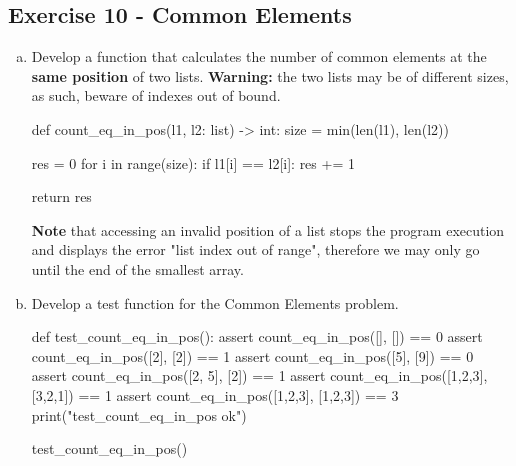 \documentclass[12pt]{article}
\begin{document}
\subsection*{Exercise 10 - Common Elements}
\begin{enumerate}[a)]
  \item Develop a function that calculates the number of common elements at the 
    \textbf{same position} of two lists. \textbf{Warning:} the two lists may be 
    of different sizes, as such, beware of indexes out of bound.
\begin{pythonlst}
def count_eq_in_pos(l1, l2: list) -> int:
  size = min(len(l1), len(l2))

  res = 0
  for i in range(size):
    if l1[i] == l2[i]:
      res += 1

  return res
\end{pythonlst}
\textbf{Note} that accessing an invalid position of a list stops the program
execution and displays the error "list index out of range", therefore we may
only go until the end of the smallest array.
  \item Develop a test function for the Common Elements problem.
\begin{pythonlst}
def test_count_eq_in_pos():
  assert count_eq_in_pos([], []) == 0
  assert count_eq_in_pos([2], [2]) == 1
  assert count_eq_in_pos([5], [9]) == 0
  assert count_eq_in_pos([2, 5], [2]) == 1
  assert count_eq_in_pos([1,2,3], [3,2,1]) == 1
  assert count_eq_in_pos([1,2,3], [1,2,3]) == 3
  print("test_count_eq_in_pos ok")

test_count_eq_in_pos()
\end{pythonlst}
\end{enumerate}
\end{document}
